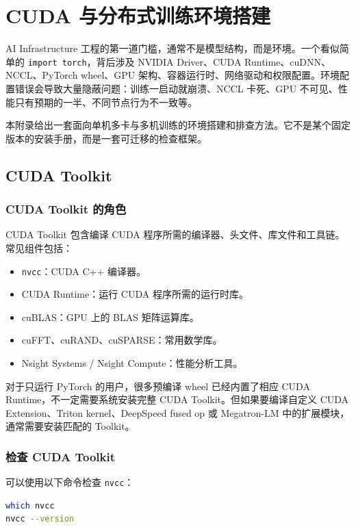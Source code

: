 

\chapter{CUDA 与分布式训练环境搭建}

AI Infrastructure 工程的第一道门槛，通常不是模型结构，而是环境。一个看似简单的 \texttt{import torch}，背后涉及 NVIDIA Driver、CUDA Runtime、cuDNN、NCCL、PyTorch wheel、GPU 架构、容器运行时、网络驱动和权限配置。环境配置错误会导致大量隐蔽问题：训练一启动就崩溃、NCCL 卡死、GPU 不可见、性能只有预期的一半、不同节点行为不一致等。

本附录给出一套面向单机多卡与多机训练的环境搭建和排查方法。它不是某个固定版本的安装手册，而是一套可迁移的检查框架。

\section{CUDA Toolkit}

\subsection{CUDA Toolkit 的角色}

CUDA Toolkit 包含编译 CUDA 程序所需的编译器、头文件、库文件和工具链。常见组件包括：

\begin{itemize}
\item \texttt{nvcc}：CUDA C++ 编译器。
\item CUDA Runtime：运行 CUDA 程序所需的运行时库。
\item cuBLAS：GPU 上的 BLAS 矩阵运算库。
\item cuFFT、cuRAND、cuSPARSE：常用数学库。
\item Nsight Systems / Nsight Compute：性能分析工具。
\end{itemize}

对于只运行 PyTorch 的用户，很多预编译 wheel 已经内置了相应 CUDA Runtime，不一定需要系统安装完整 CUDA Toolkit。但如果要编译自定义 CUDA Extension、Triton kernel、DeepSpeed fused op 或 Megatron-LM 中的扩展模块，通常需要安装匹配的 Toolkit。

\subsection{检查 CUDA Toolkit}

可以使用以下命令检查 \texttt{nvcc}：

\begin{lstlisting}[language=bash,caption={检查 CUDA Toolkit},label={lst:check-cuda-toolkit}]
which nvcc
nvcc --version
\end{lstlisting}

